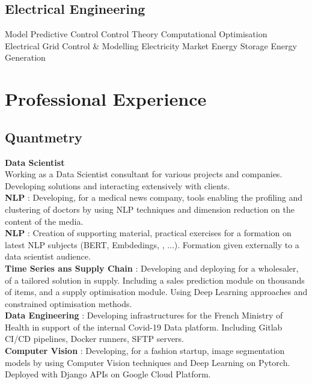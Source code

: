 \documentclass{article}
\newcommand{\descript}[1]{\color{darkgray}\normalfont \textbf{#1\\}}
\newcommand{\longdescript}[1]{\color{subheadings}\normalfont\small {#1\\} }
\newcommand{\location}[1]{\color{primary}\headingfont {\hfill #1\\} }
\newcommand{\sectionsep}[0]{\vspace{-6pt}}
\newcommand{\mybullet}[1]{ \hspace{2pt}\textbullet{#1}\hspace{2pt} }
\begin{document}
\subsection{Electrical Engineering}
\longdescript{ \mybullet{} Model Predictive Control \mybullet{} Control Theory \mybullet{} Computational Optimisation \\  \hspace*{3pt}  Electrical Grid Control \& Modelling \mybullet{} Electricity Market \mybullet{} Energy Storage \mybullet{} Energy Generation}
\sectionsep




\section{Professional Experience}

\subsection{Quantmetry}
\location{Paris, France | Sept 2019 - Today}
\descript{Data Scientist}
\longdescript{Working as a Data Scientist consultant for various projects and companies. Developing solutions and interacting extensively with clients.  \\ \textbf{NLP} : Developing, for a medical news company, tools enabling the profiling and clustering of doctors by using NLP techniques and dimension reduction on the content of the media. \\ \textbf{NLP} : Creation of supporting material, practical exercises for a formation on latest NLP subjects (BERT, Embdedings, , ...). Formation given externally to a data scientist audience. \\ \textbf{Time Series ans Supply Chain} : Developing and deploying for a wholesaler, of a tailored solution in supply. Including a sales prediction module on thousands of items, and a supply optimisation module. Using Deep Learning approaches and constrained optimisation methods.\\ \textbf{Data Engineering} : Developing infrastructures for the French Ministry of Health in support of the internal Covid-19 Data platform. Including Gitlab CI/CD pipelines, Docker runners, SFTP servers. \\ \textbf{Computer Vision} : Developing, for a fashion startup, image segmentation models by using Computer Vision techniques and Deep Learning on Pytorch. Deployed with Django APIs on Google Cloud Platform. } 
\sectionsep
\end{document}
